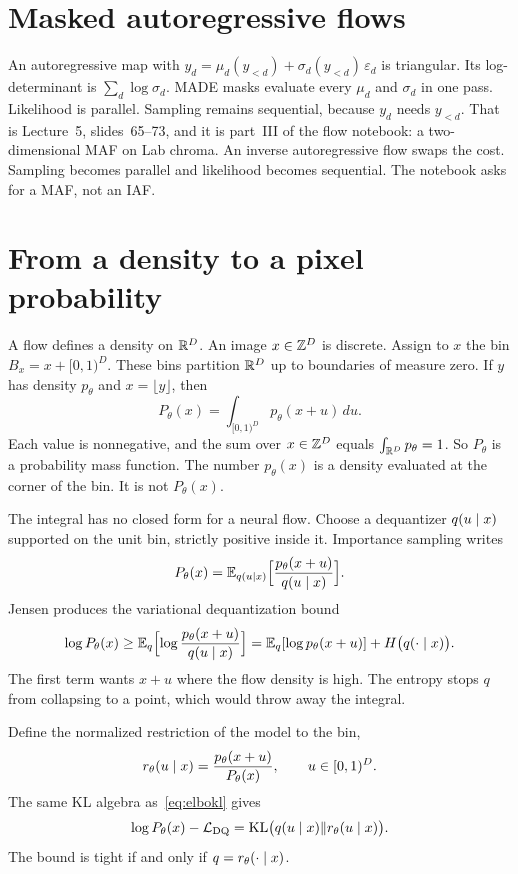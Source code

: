 \section{Masked autoregressive flows}

An autoregressive map with $y_d=\mu_d(y_{<d})+\sigma_d(y_{<d})\,\varepsilon_d$ is triangular. Its log-determinant is $\sum_d\log\sigma_d$. MADE masks evaluate every $\mu_d$ and $\sigma_d$ in one pass. Likelihood is parallel. Sampling remains sequential, because $y_d$ needs $y_{<d}$. That is Lecture~5, slides~65--73, and it is part~III of the flow notebook: a two-dimensional MAF on Lab chroma. An inverse autoregressive flow swaps the cost. Sampling becomes parallel and likelihood becomes sequential. The notebook asks for a MAF, not an IAF.

\section{From a density to a pixel probability}

A flow defines a density on $\mathbb{R}^D$. An image $x\in\mathbb{Z}^D$ is discrete. Assign to $x$ the bin $B_x=x+[0,1)^D$. These bins partition $\mathbb{R}^D$ up to boundaries of measure zero. If $y$ has density $p_\theta$ and $x=\lfloor y\rfloor$, then
\[
P_\theta(x)=\int_{[0,1)^D}p_\theta(x+u)\,du.
\]
Each value is nonnegative, and the sum over $x\in\mathbb{Z}^D$ equals $\int_{\mathbb{R}^D}p_\theta=1$. So $P_\theta$ is a probability mass function. The number $p_\theta(x)$ is a density evaluated at the corner of the bin. It is not $P_\theta(x)$.

The integral has no closed form for a neural flow. Choose a dequantizer $q(u\mid x)$ supported on the unit bin, strictly positive inside it. Importance sampling writes
\[
P_\theta(x)=\mathbb{E}_{q(u\mid x)}\Bigl[\frac{p_\theta(x+u)}{q(u\mid x)}\Bigr].
\]
Jensen produces the variational dequantization bound
\begin{equation}
\label{eq:dq}
\log P_\theta(x)
\ge
\mathbb{E}_{q}\Bigl[\log\frac{p_\theta(x+u)}{q(u\mid x)}\Bigr]
=\mathbb{E}_q[\log p_\theta(x+u)]+H\bigl(q(\cdot\mid x)\bigr).
\end{equation}
The first term wants $x+u$ where the flow density is high. The entropy stops $q$ from collapsing to a point, which would throw away the integral.

Define the normalized restriction of the model to the bin,
\[
r_\theta(u\mid x)=\frac{p_\theta(x+u)}{P_\theta(x)},\qquad u\in[0,1)^D.
\]
The same KL algebra as~\eqref{eq:elbokl} gives
\[
\log P_\theta(x)-\mathcal L_{\mathrm{DQ}}
=\mathrm{KL}\bigl(q(u\mid x)\Vert r_\theta(u\mid x)\bigr).
\]
The bound is tight if and only if $q=r_\theta(\cdot\mid x)$.

